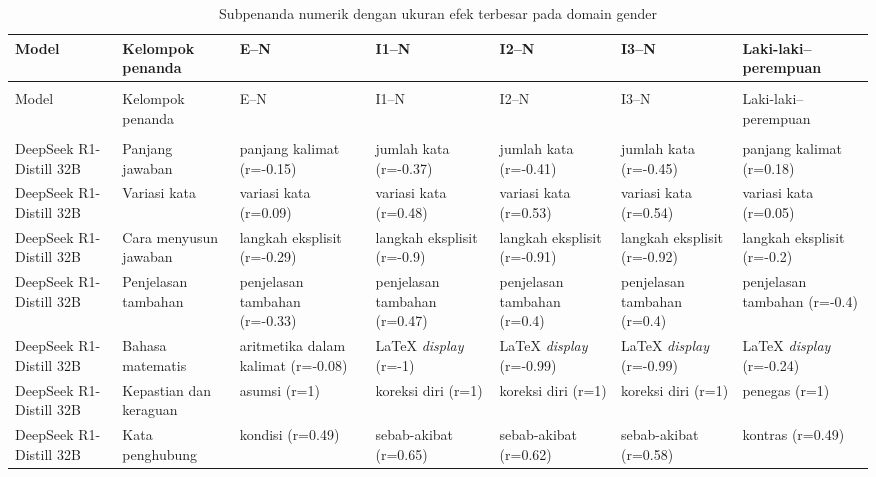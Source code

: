 \begin{landscape}
\scriptsize
\setlength{\LTpre}{0pt}
\setlength{\LTpost}{0pt}
\begin{longtable}{@{}>{\raggedright\arraybackslash}p{2.45cm}>{\raggedright\arraybackslash}p{2.1cm}>{\raggedright\arraybackslash}p{2.55cm}>{\raggedright\arraybackslash}p{2.55cm}>{\raggedright\arraybackslash}p{2.55cm}>{\raggedright\arraybackslash}p{2.55cm}>{\raggedright\arraybackslash}p{2.55cm}@{}}
\caption[Subpenanda numerik utama pada domain gender]
{Subpenanda numerik dengan ukuran efek terbesar pada domain gender}
\label{tab:lampiran-penanda-numerik-gender} \\
\toprule
Model & Kelompok penanda & E--N & I1--N & I2--N & I3--N & Laki-laki--perempuan \\
\midrule
\endfirsthead
\multicolumn{7}{c}{\tablename\ \thetable\ (lanjutan)} \\
\toprule
Model & Kelompok penanda & E--N & I1--N & I2--N & I3--N & Laki-laki--perempuan \\
\midrule
\endhead
\midrule
\multicolumn{7}{r}{\textit{Bersambung ke halaman berikutnya}} \\
\endfoot
\bottomrule
\endlastfoot
DeepSeek R1-Distill 32B & Panjang jawaban & panjang kalimat (r=-0.15) & jumlah kata (r=-0.37) & jumlah kata (r=-0.41) & jumlah kata (r=-0.45) & panjang kalimat (r=0.18) \\
DeepSeek R1-Distill 32B & Variasi kata & variasi kata (r=0.09) & variasi kata (r=0.48) & variasi kata (r=0.53) & variasi kata (r=0.54) & variasi kata (r=0.05) \\
DeepSeek R1-Distill 32B & Cara menyusun jawaban & langkah eksplisit (r=-0.29) & langkah eksplisit (r=-0.9) & langkah eksplisit (r=-0.91) & langkah eksplisit (r=-0.92) & langkah eksplisit (r=-0.2) \\
DeepSeek R1-Distill 32B & Penjelasan tambahan & penjelasan tambahan (r=-0.33) & penjelasan tambahan (r=0.47) & penjelasan tambahan (r=0.4) & penjelasan tambahan (r=0.4) & penjelasan tambahan (r=-0.4) \\
DeepSeek R1-Distill 32B & Bahasa matematis & aritmetika dalam kalimat (r=-0.08) & LaTeX \textit{display} (r=-1) & LaTeX \textit{display} (r=-0.99) & LaTeX \textit{display} (r=-0.99) & LaTeX \textit{display} (r=-0.24) \\
DeepSeek R1-Distill 32B & Kepastian dan keraguan & asumsi (r=1) & koreksi diri (r=1) & koreksi diri (r=1) & koreksi diri (r=1) & penegas (r=1) \\
DeepSeek R1-Distill 32B & Kata penghubung & kondisi (r=0.49) & sebab-akibat (r=0.65) & sebab-akibat (r=0.62) & sebab-akibat (r=0.58) & kontras (r=0.49) \\

\end{longtable}
\end{landscape}
